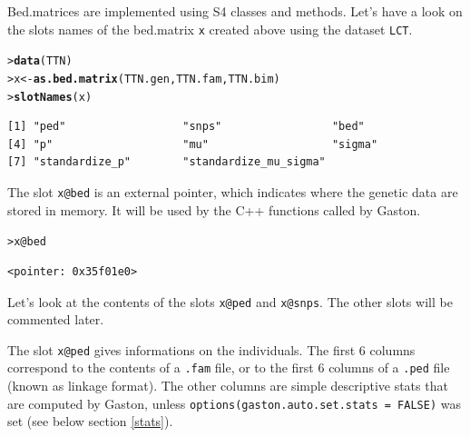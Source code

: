 \documentclass{article}\usepackage[]{graphicx}\usepackage[]{color}
\makeatletter
\newcommand{\hlopt}[1]{\textcolor[rgb]{0,0,0}{#1}}%
\newcommand{\hlstd}[1]{\textcolor[rgb]{0.345,0.345,0.345}{#1}}%
\newcommand{\hlkwb}[1]{\textcolor[rgb]{0.69,0.353,0.396}{#1}}%
\newcommand{\hlkwc}[1]{\textcolor[rgb]{0.333,0.667,0.333}{#1}}%
\newcommand{\hlkwd}[1]{\textcolor[rgb]{0.737,0.353,0.396}{\textbf{#1}}}%
\newenvironment{kframe}{%
 \def\at@end@of@kframe{}%
 \ifinner\ifhmode%
  \def\at@end@of@kframe{\end{minipage}}%
  \begin{minipage}{\columnwidth}%
 \fi\fi%
 \def\FrameCommand##1{\hskip\@totalleftmargin \hskip-\fboxsep
 \colorbox{shadecolor}{##1}\hskip-\fboxsep
     \hskip-\linewidth \hskip-\@totalleftmargin \hskip\columnwidth}%
 \MakeFramed {\advance\hsize-\width
   \@totalleftmargin\z@ \linewidth\hsize
   \@setminipage}}%
 {\par\unskip\endMakeFramed%
 \at@end@of@kframe}
\newenvironment{knitrout}{}{} %
\makeatother
\begin{document}
  Bed.matrices are implemented using S4 classes and methods.
  Let's have a look on the slots names of the bed.matrix \verb!x! created above using the dataset \verb!LCT!.

\begin{knitrout}
\color{fgcolor}\begin{kframe}
\begin{alltt}
\hlstd{> }\hlkwd{data}\hlstd{(TTN)}
\hlstd{> }\hlstd{x} \hlkwb{<-} \hlkwd{as.bed.matrix}\hlstd{(TTN.gen, TTN.fam, TTN.bim)}
\hlstd{> }\hlkwd{slotNames}\hlstd{(x)}
\end{alltt}
\begin{verbatim}
[1] "ped"                  "snps"                 "bed"                 
[4] "p"                    "mu"                   "sigma"               
[7] "standardize_p"        "standardize_mu_sigma"
\end{verbatim}
\end{kframe}
\end{knitrout}

  The slot \verb!x@bed! is an external pointer, which indicates where the genetic data are stored in
  memory. It will be used by the C++ functions called by Gaston. 
\begin{knitrout}
\color{fgcolor}\begin{kframe}
\begin{alltt}
\hlstd{> }\hlstd{x}\hlopt{@}\hlkwc{bed}
\end{alltt}
\begin{verbatim}
<pointer: 0x35f01e0>
\end{verbatim}
\end{kframe}
\end{knitrout}

  Let's look at the contents of the slots \verb!x@ped! and \verb!x@snps!.
  The other slots will be commented later.

  The slot \verb!x@ped! gives informations on the individuals. 
  The first 6 columns correspond to the contents of a \verb!.fam! file, or to the first 6 columns of a \verb!.ped! file 
  (known as linkage format). The other columns are simple descriptive
  stats that are computed by Gaston, unless \verb!options(gaston.auto.set.stats = FALSE)!
  was set (see below section \ref{stats}).
\end{document}
